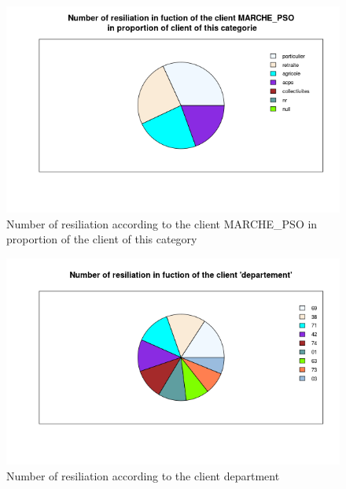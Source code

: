 \documentclass[a4paper, 11pt]{article}
\begin{document}
    \begin{figure}[!ht]
    	\centering
            \includegraphics[height = 10 cm]{Valentin/Number_of_resiliation_in_fuction_of_the_client_MARCHE_PSO_proportion.png}
            \caption{Number of resiliation according to the client MARCHE\_PSO in proportion of the client of this category}
            \label{fig:resiliation_pso2}
    \end{figure}
    
    \begin{figure}[!ht]
    	\centering
            \includegraphics[height = 10 cm]{Valentin/Number_of_resiliation_in_fuction_of_the_client_departement.png}
            \caption{Number of resiliation according to the client department}
            \label{fig:resiliation_dep1}
    \end{figure}
    
\end{document}
